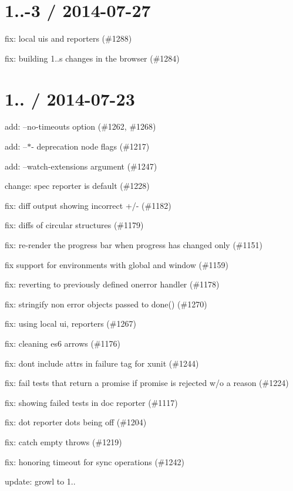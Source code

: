 \section*{1..-\/3 / 2014-\/07-\/27}


\begin{DoxyItemize}
\item fix\+: local uis and reporters (\#1288)
\item fix\+: building 1..\textquotesingle{}s changes in the browser (\#1284)
\end{DoxyItemize}

\section*{1.. / 2014-\/07-\/23}


\begin{DoxyItemize}
\item add\+: --no-\/timeouts option (\#1262, \#1268)
\item add\+: --$\ast$-\/ deprecation node flags (\#1217)
\item add\+: --watch-\/extensions argument (\#1247)
\item change\+: spec reporter is default (\#1228)
\item fix\+: diff output showing incorrect +/-\/ (\#1182)
\item fix\+: diffs of circular structures (\#1179)
\item fix\+: re-\/render the progress bar when progress has changed only (\#1151)
\item fix support for environments with global and window (\#1159)
\item fix\+: reverting to previously defined onerror handler (\#1178)
\item fix\+: stringify non error objects passed to done() (\#1270)
\item fix\+: using local ui, reporters (\#1267)
\item fix\+: cleaning es6 arrows (\#1176)
\item fix\+: don\textquotesingle{}t include attrs in failure tag for xunit (\#1244)
\item fix\+: fail tests that return a promise if promise is rejected w/o a reason (\#1224)
\item fix\+: showing failed tests in doc reporter (\#1117)
\item fix\+: dot reporter dots being off (\#1204)
\item fix\+: catch empty throws (\#1219)
\item fix\+: honoring timeout for sync operations (\#1242)
\item update\+: growl to 1..
\end{DoxyItemize}

